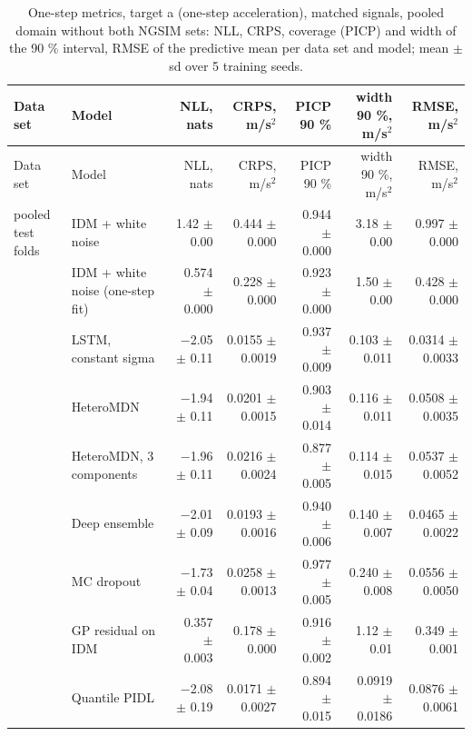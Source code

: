 \begingroup
\footnotesize
\begin{longtable}{llrrrrr}
\caption{One-step metrics, target a (one-step acceleration), matched signals, pooled domain without both NGSIM sets: NLL, CRPS, coverage (PICP) and width of the 90 \% interval, RMSE of the predictive mean per data set and model; mean $\pm$ sd over 5 training seeds.}\label{tab:t1-one-step--lodo-ngsim-all--a} \\
\toprule
Data set & Model & NLL, nats & CRPS, m/s$^2$ & PICP 90 \% & width 90 \%, m/s$^2$ & RMSE, m/s$^2$ \\
\midrule
\endfirsthead
\toprule
Data set & Model & NLL, nats & CRPS, m/s$^2$ & PICP 90 \% & width 90 \%, m/s$^2$ & RMSE, m/s$^2$ \\
\midrule
\endhead
\bottomrule
\endlastfoot
pooled test folds & IDM + white noise & 1.42 $\pm$ 0.00 & 0.444 $\pm$ 0.000 & 0.944 $\pm$ 0.000 & 3.18 $\pm$ 0.00 & 0.997 $\pm$ 0.000 \\
 & IDM + white noise (one-step fit) & 0.574 $\pm$ 0.000 & 0.228 $\pm$ 0.000 & 0.923 $\pm$ 0.000 & 1.50 $\pm$ 0.00 & 0.428 $\pm$ 0.000 \\
 & LSTM, constant sigma & $-$2.05 $\pm$ 0.11 & 0.0155 $\pm$ 0.0019 & 0.937 $\pm$ 0.009 & 0.103 $\pm$ 0.011 & 0.0314 $\pm$ 0.0033 \\
 & HeteroMDN & $-$1.94 $\pm$ 0.11 & 0.0201 $\pm$ 0.0015 & 0.903 $\pm$ 0.014 & 0.116 $\pm$ 0.011 & 0.0508 $\pm$ 0.0035 \\
 & HeteroMDN, 3 components & $-$1.96 $\pm$ 0.11 & 0.0216 $\pm$ 0.0024 & 0.877 $\pm$ 0.005 & 0.114 $\pm$ 0.015 & 0.0537 $\pm$ 0.0052 \\
 & Deep ensemble & $-$2.01 $\pm$ 0.09 & 0.0193 $\pm$ 0.0016 & 0.940 $\pm$ 0.006 & 0.140 $\pm$ 0.007 & 0.0465 $\pm$ 0.0022 \\
 & MC dropout & $-$1.73 $\pm$ 0.04 & 0.0258 $\pm$ 0.0013 & 0.977 $\pm$ 0.005 & 0.240 $\pm$ 0.008 & 0.0556 $\pm$ 0.0050 \\
 & GP residual on IDM & 0.357 $\pm$ 0.003 & 0.178 $\pm$ 0.000 & 0.916 $\pm$ 0.002 & 1.12 $\pm$ 0.01 & 0.349 $\pm$ 0.001 \\
 & Quantile PIDL & $-$2.08 $\pm$ 0.19 & 0.0171 $\pm$ 0.0027 & 0.894 $\pm$ 0.015 & 0.0919 $\pm$ 0.0186 & 0.0876 $\pm$ 0.0061 \\

\end{longtable}

